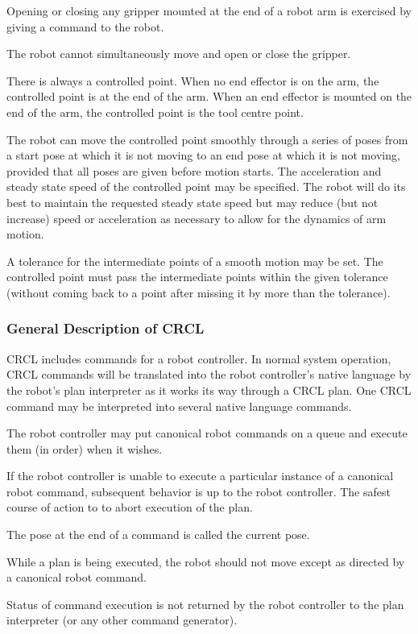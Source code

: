 Opening or closing any gripper mounted at the end of a robot arm is
exercised by giving a command to the robot.

The robot cannot simultaneously move and open or close the gripper.

There is always a controlled point. When no end effector is on the arm,
the controlled point is at the end of the arm. When an end effector
is mounted on the end of the arm, the controlled point is the tool
centre point.

The robot can move the controlled point smoothly through a series of
poses from a start pose at which it is not moving to an end pose at
which it is not moving, provided that all poses are given before
motion starts. The acceleration and steady state speed of the
controlled point may be specified. The robot will do its best to
maintain the requested steady state speed but may reduce (but not
increase) speed or acceleration as necessary to allow for the dynamics
of arm motion.

A tolerance for the intermediate points of a smooth motion may be set.
The controlled point must pass the intermediate points within the
given tolerance (without coming back to a point after missing it by
more than the tolerance).\\

\subsubsection{General Description of CRCL}

CRCL includes commands for a robot controller. In normal system operation,
CRCL commands will be translated into the robot controller's native
language by the robot's plan interpreter as it works its way through a
CRCL plan. One CRCL command may be interpreted into several native
language commands.

The robot controller may put canonical robot commands on a queue and
execute them (in order) when it wishes.

If the robot controller is unable to execute a particular instance of a
canonical robot command, subsequent behavior is up to the robot
controller. The safest course of action to to abort execution of the
plan.

The pose at the end of a command is called the current pose.

While a plan is being executed, the robot should not move except as
directed by a canonical robot command.

Status of command execution is not returned by the robot controller to
the plan interpreter (or any other command generator).

